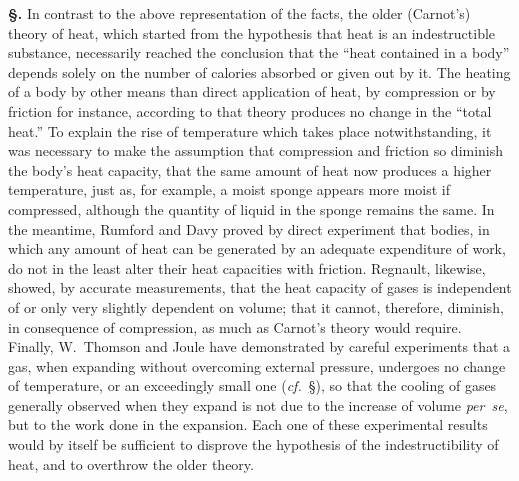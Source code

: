 \documentclass[12pt]{book}[2005/09/16]
\newcommand{\Section}[1]{
  \medskip\par\textbf{§\;#1}
  \label{section:#1}
}
\newcommand{\SecRef}[2][§\;]{\hyperref[section:#2.]{{\upshape #1#2}}}
\renewcommand{\cf}{\emph{cf.}}
\begin{document}
\Section{52.} In contrast to the above representation of the facts,
the older (Carnot's) theory of heat, which started from the
%
%
hypothesis that heat is an indestructible substance, necessarily
reached the conclusion that the ``heat contained in a
body'' depends solely on the number of calories absorbed
or given out by it. The heating of a body by other means
than direct application of heat, by compression or by friction
for instance, according to that theory produces no change in
the ``total heat.'' To explain the rise of temperature which
takes place notwithstanding, it was necessary to make the
assumption that compression and friction so diminish the
body's heat capacity, that the same amount of heat now
produces a higher temperature, just as, for example, a
moist sponge appears more moist if compressed, although
the quantity of liquid in the sponge remains the same. In
the meantime, Rumford and Davy proved by direct experiment
%
%
that bodies, in which any amount of heat can be
generated by an adequate expenditure of work, do not in
the least alter their heat capacities with friction. Regnault,
likewise, showed, by accurate measurements, that the heat
capacity of gases is independent of or only very slightly
dependent on volume; that it cannot, therefore, diminish,
in consequence of compression, as much as Carnot's theory
would require. Finally, W.~Thomson and Joule have
%
%
demonstrated by careful experiments that a gas, when expanding
without overcoming external pressure, undergoes
no change of temperature, or an exceedingly small one
(\cf~\SecRef{70}), so that the cooling of gases generally observed
when they expand is not due to the increase of volume \textit{per~se},
but to the work done in the expansion. Each one of
these experimental results would by itself be sufficient to
disprove the hypothesis of the indestructibility of heat, and
to overthrow the older theory.
\end{document}
